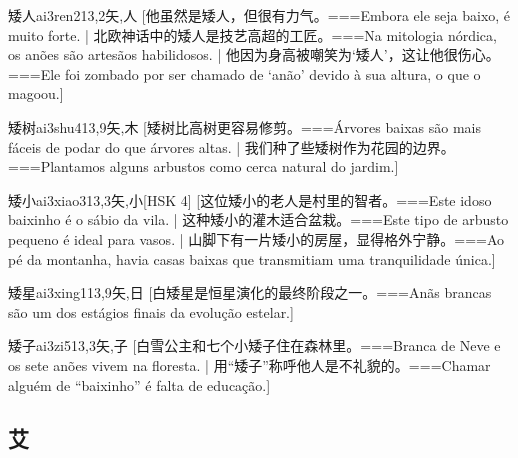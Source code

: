 \begin{EntryWithPhonetic}{矮人}{ai3ren2}{13,2}{⽮,⼈}
  [他虽然是矮人，但很有力气。===Embora ele seja baixo, é muito forte. | 北欧神话中的矮人是技艺高超的工匠。===Na mitologia nórdica, os anões são artesãos habilidosos. | 他因为身高被嘲笑为‘矮人’，这让他很伤心。===Ele foi zombado por ser chamado de ‘anão’ devido à sua altura, o que o magoou.]
\end{EntryWithPhonetic}

\begin{EntryWithPhonetic}{矮树}{ai3shu4}{13,9}{⽮,⽊}
  [矮树比高树更容易修剪。===Árvores baixas são mais fáceis de podar do que árvores altas. | 我们种了些矮树作为花园的边界。===Plantamos alguns arbustos como cerca natural do jardim.]
\end{EntryWithPhonetic}

\begin{EntryWithPhonetic}{矮小}{ai3xiao3}{13,3}{⽮,⼩}[HSK 4]
  [这位矮小的老人是村里的智者。===Este idoso baixinho é o sábio da vila. | 这种矮小的灌木适合盆栽。===Este tipo de arbusto pequeno é ideal para vasos. | 山脚下有一片矮小的房屋，显得格外宁静。===Ao pé da montanha, havia casas baixas que transmitiam uma tranquilidade única.]
\end{EntryWithPhonetic}

\begin{EntryWithPhonetic}{矮星}{ai3xing1}{13,9}{⽮,⽇}
  [白矮星是恒星演化的最终阶段之一。===Anãs brancas são um dos estágios finais da evolução estelar.]
\end{EntryWithPhonetic}

\begin{EntryWithPhonetic}{矮子}{ai3zi5}{13,3}{⽮,⼦}
  [白雪公主和七个小矮子住在森林里。===Branca de Neve e os sete anões vivem na floresta. | 用``矮子''称呼他人是不礼貌的。===Chamar alguém de ``baixinho'' é falta de educação.]
\end{EntryWithPhonetic}

\subsection*{艾}

